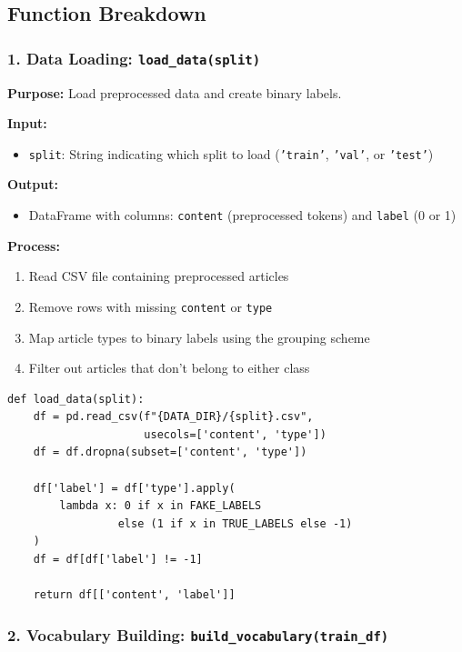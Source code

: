 \documentclass[11pt,a4paper]{article}
\begin{document}
\subsection{Function Breakdown}

\subsubsection{1. Data Loading: \texttt{load\_data(split)}}

\textbf{Purpose:} Load preprocessed data and create binary labels.

\textbf{Input:} 
\begin{itemize}
    \item \texttt{split}: String indicating which split to load (\texttt{'train'}, \texttt{'val'}, or \texttt{'test'})
\end{itemize}

\textbf{Output:}
\begin{itemize}
    \item DataFrame with columns: \texttt{content} (preprocessed tokens) and \texttt{label} (0 or 1)
\end{itemize}

\textbf{Process:}
\begin{enumerate}
    \item Read CSV file containing preprocessed articles
    \item Remove rows with missing \texttt{content} or \texttt{type}
    \item Map article types to binary labels using the grouping scheme
    \item Filter out articles that don't belong to either class
\end{enumerate}

\begin{lstlisting}[style=pythonstyle, caption={Data Loading Function}]
def load_data(split):
    df = pd.read_csv(f"{DATA_DIR}/{split}.csv", 
                     usecols=['content', 'type'])
    df = df.dropna(subset=['content', 'type'])
    
    df['label'] = df['type'].apply(
        lambda x: 0 if x in FAKE_LABELS 
                 else (1 if x in TRUE_LABELS else -1)
    )
    df = df[df['label'] != -1]
    
    return df[['content', 'label']]
\end{lstlisting}

\subsubsection{2. Vocabulary Building: \texttt{build\_vocabulary(train\_df)}}
\end{document}
